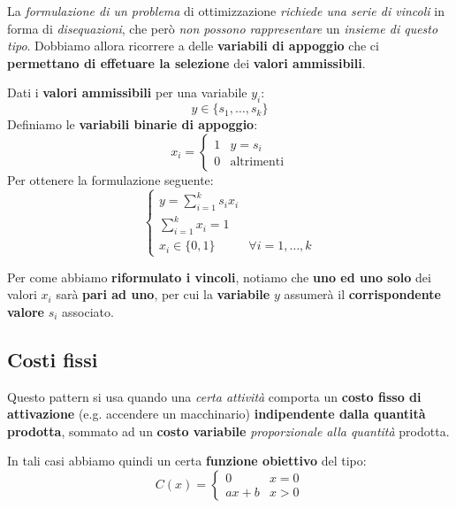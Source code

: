 La \textit{formulazione di un problema} di ottimizzazione \textit{richiede una serie di vincoli} 
in forma di \textit{disequazioni}, che però \textit{non possono rappresentare} un
\textit{insieme di questo tipo}.
Dobbiamo allora ricorrere a delle \textbf{variabili di appoggio} che ci
\textbf{permettano di effetuare la selezione} dei \textbf{valori ammissibili}.

\begin{definition}
    Dati i \textbf{valori ammissibili} per una variabile $y_i$:
    \[
        y \in \{ s_{1},\ldots , s_k\}  
    \] 
    Definiamo le \textbf{variabili binarie di appoggio}:
    \[
        x_i = \begin{cases}
            1 & y = s_i \\ 
            0 & \text{altrimenti}
        \end{cases}
    \] 
    Per ottenere la formulazione seguente:
    \[
        \begin{cases}
            y = \sum_{i=1}^k s_i x_i \\ 
            \sum_{i=1}^k x_i = 1 \\ 
            x_i \in \{0,1\} & \forall i = 1,\ldots ,k  
        \end{cases}
    \] 
\end{definition}

\begin{remark}
    Per come abbiamo \textbf{riformulato i vincoli}, notiamo che \textbf{uno ed uno solo}
    dei valori $x_i$ sarà \textbf{pari ad uno}, per cui la \textbf{variabile}
    $y$ assumerà il \textbf{corrispondente valore} $s_i$ associato.
\end{remark}

\subsection{Costi fissi}

Questo pattern si usa quando una \textit{certa attività} comporta un 
\textbf{costo fisso di attivazione} (e.g. accendere un macchinario) 
\textbf{indipendente dalla quantità prodotta}, sommato ad un \textbf{costo variabile} 
\textit{proporzionale alla quantità} prodotta.

In tali casi abbiamo quindi un certa \textbf{funzione obiettivo} del tipo:
\[
    C(x) = \begin{cases}
        0 & x = 0 \\ 
        ax + b & x > 0
    \end{cases}  
\]

